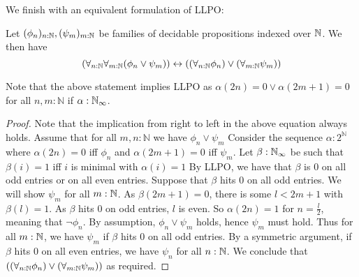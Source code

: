 We finish with an equivalent formulation of LLPO:
\begin{lemma}\label{corAlternativeLLPO}
  Let $(\phi_n)_{n:\mathbb{N}}, (\psi_m)_{m:\mathbb{N}}$ be families of decidable propositions indexed over $\mathbb{N}$.
  We then have 
  \begin{equation}
    (\forall_{n:\mathbb{N}} \forall_{m:\mathbb{N}} (\phi_n \vee \psi_m) )
    \leftrightarrow
    ((\forall_{n:\mathbb{N}} \phi_n) \vee (\forall_{m:\mathbb{N}} \psi_m) )
  \end{equation}
\end{lemma}
Note that the above statement implies LLPO as 
$\alpha(2n) =0 \vee \alpha(2m+1) =0$ for all $n,m:\mathbb N$ if $\alpha:\mathbb{N}_{\infty}$. 
\begin{proof}
  Note that the implication from right to left in the above equation always holds.
  Assume that for all $m,n:\mathbb N$ we have $\phi_n\vee \psi_m$ 
  Consider the sequence $\alpha:2^\mathbb N$ where $\alpha(2n) = 0$ iff $\phi_n$ and 
  $\alpha(2m+1) = 0$ iff $\psi_m$. 
  Let $\beta:\mathbb{N}_{\infty}$ be such that $\beta(i) = 1$ iff $i$ is minimal with $\alpha(i) = 1$
  By LLPO, we have that 
  $\beta$ is $0$ on all odd entries or on all even entries. 
  Suppose that $\beta$ hits $0$ on all odd entries. 
  We will show $\psi_m$ for all $m:\mathbb{N}$. 
  As $\beta(2m+1) = 0$, there is some $l<2m+1$ with $\beta(l) = 1$. 
  As $\beta$ hits $0$ on odd entries, $l$ is even. 
  So $\alpha(2n) = 1$ for $n = \frac{l}2$, meaning that $\neg \phi_n$. 
  By assumption, $\phi_n \vee \psi_m$ holds, hence $\psi_m$ must hold. 
  Thus for all $m:\mathbb{N}$, we have $\psi_m$ if $\beta$ hits $0$ on all odd entries. 
  By a symmetric argument, if $\beta$ hits $0$ on all even entries, we have $\psi_n$ for all $n:\mathbb{N}$. 
  We conclude that 
  $((\forall_{n:\mathbb{N}} \phi_n) \vee (\forall_{m:\mathbb{N}} \psi_m) )$ 
  as required. 
\end{proof}
